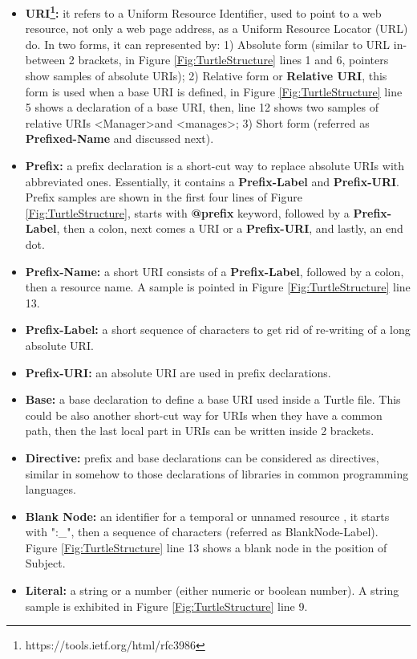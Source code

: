 \begin{itemize}
    \item \textbf{URI\footnote{https://tools.ietf.org/html/rfc3986
}:} it refers to a Uniform Resource Identifier, used to point to a web resource, not only a web page address, as a Uniform Resource Locator (URL) do. In two forms, it can represented by: 1) Absolute form (similar to URL in-between 2 brackets, in Figure \ref{Fig:TurtleStructure} lines 1 and 6, pointers show samples of absolute URIs); 2) Relative form or \textbf{Relative URI}, this form is used when a base URI is defined, in Figure \ref{Fig:TurtleStructure} line 5 shows a declaration of a base URI, then, line 12 shows two samples of relative URIs \textless Manager\textgreater and \textless manages\textgreater ; 3) Short form (referred as \textbf{Prefixed-Name} and discussed next).
  \item \textbf{Prefix:} a prefix declaration is a  short-cut way to replace absolute URIs with abbreviated ones. Essentially, it contains a \textbf{Prefix-Label} and \textbf{Prefix-URI}. Prefix samples are shown in the first four lines of Figure \ref{Fig:TurtleStructure}, starts with \textbf{@prefix} keyword, followed by a \textbf{Prefix-Label}, then a colon, next comes a URI or a \textbf{Prefix-URI}, and lastly, an end dot. 
        \item \textbf{Prefix-Name:} a short URI consists of a \textbf{Prefix-Label}, followed by a colon, then a resource name. A sample is pointed in Figure \ref{Fig:TurtleStructure} line 13.
        
        \item \textbf{Prefix-Label:} a short sequence of characters to get rid of  re-writing of a long absolute URI.
        \item \textbf{Prefix-URI:} an absolute URI are used in prefix declarations. 
        \item \textbf{Base:} a base declaration to define a base URI used inside a Turtle file. This could be also another short-cut way for URIs when they have a common path, then the last local part in URIs can be written inside 2 brackets.  
\item \textbf{Directive:} prefix and base declarations can be considered as directives, similar in somehow to those declarations of libraries in common programming languages.  
    \item \textbf{Blank Node:} an identifier for a temporal or unnamed resource \cite{journals:tkde:GutierrezHV07}, it starts with ":\_", then a sequence of characters (referred as BlankNode-Label). Figure \ref{Fig:TurtleStructure} line 13 shows a blank node in the position of Subject.  
    \item \textbf{Literal:} a string or a number (either numeric or boolean number). A string sample is exhibited in Figure \ref{Fig:TurtleStructure} line 9.
\end{itemize} 

